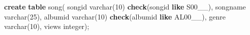 \documentclass[
]{article}
\newenvironment{Shaded}{}{}
\newcommand{\DataTypeTok}[1]{\textcolor[rgb]{0.56,0.13,0.00}{#1}}
\newcommand{\DecValTok}[1]{\textcolor[rgb]{0.25,0.63,0.44}{#1}}
\newcommand{\KeywordTok}[1]{\textcolor[rgb]{0.00,0.44,0.13}{\textbf{#1}}}
\newcommand{\NormalTok}[1]{#1}
\newcommand{\StringTok}[1]{\textcolor[rgb]{0.25,0.44,0.63}{#1}}
\begin{document}
\begin{Shaded}
\begin{Highlighting}[]
\KeywordTok{create} \KeywordTok{table}\NormalTok{ song(}
\NormalTok{   songid }\DataTypeTok{varchar}\NormalTok{(}\DecValTok{10}\NormalTok{) }\KeywordTok{check}\NormalTok{(songid }\KeywordTok{like} \StringTok{\textquotesingle{}S00\_\_\textquotesingle{}}\NormalTok{),}
\NormalTok{   songname }\DataTypeTok{varchar}\NormalTok{(}\DecValTok{25}\NormalTok{),}
\NormalTok{   albumid }\DataTypeTok{varchar}\NormalTok{(}\DecValTok{10}\NormalTok{) }\KeywordTok{check}\NormalTok{(albumid }\KeywordTok{like} \StringTok{\textquotesingle{}AL00\_\_\textquotesingle{}}\NormalTok{),}
\NormalTok{   genre }\DataTypeTok{varchar}\NormalTok{(}\DecValTok{10}\NormalTok{),}
\NormalTok{   views }\DataTypeTok{integer}\NormalTok{);}


\end{Highlighting}
\end{Shaded}
\end{document}

